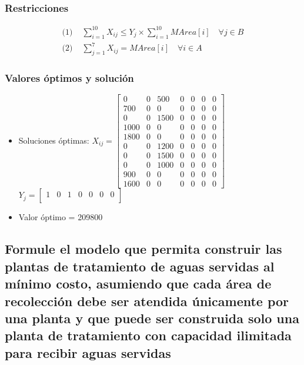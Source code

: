 \documentclass[a4paper,12pt]{article}
\begin{document}
\subsubsection{Restricciones}
\begin{equation*}
\begin{split}
	\text{(1) }& \sum_{i=1}^{10}X_{ij}\leq Y_{j}\times \sum_{i=1}^{10}MArea[i]\quad\forall j\in B\\
	\text{(2) }&\sum_{j=1}^{7}X_{ij}=MArea[i]\quad\forall i\in A
\end{split}
\end{equation*}
\subsubsection{Valores óptimos y solución}
\begin{itemize}
	\item Soluciones óptimas: $X_{ij}=
	\begin{bmatrix}
	0 & 0 & 500 & 0 & 0 & 0 & 0\\
	700 & 0 & 0 & 0 & 0 & 0 & 0\\
	0 & 0 & 1500 & 0 & 0 & 0 & 0\\
	1000 & 0 & 0 & 0 & 0 & 0 & 0\\
	1800 & 0 & 0 & 0 & 0 & 0 & 0\\
	0 & 0 & 1200 & 0 & 0 & 0 & 0\\
	0 & 0 & 1500 & 0 & 0 & 0 & 0\\
	0 & 0 & 1000 & 0 & 0 & 0 & 0\\
	900 & 0 & 0 & 0 & 0 & 0 & 0\\
	1600 & 0 & 0 & 0 & 0 & 0 & 0
	\end{bmatrix}$
	\\
	$Y_{j}=
	\begin{bmatrix}
	1 & 0 & 1 & 0 & 0 & 0 & 0\\
	\end{bmatrix}$
	\item Valor óptimo = 209800
\end{itemize}
\subsection{Formule  el  modelo  que  permita  construir  las  plantas de  tratamiento  de  aguas  servidas  al  mínimo  costo, asumiendo  que  cada  área  de  recolección  debe  ser  atendida  únicamente  por  una  planta  y  que  puede  ser construida solo una planta de tratamiento con capacidad ilimitada para recibir aguas servidas}
\end{document}
